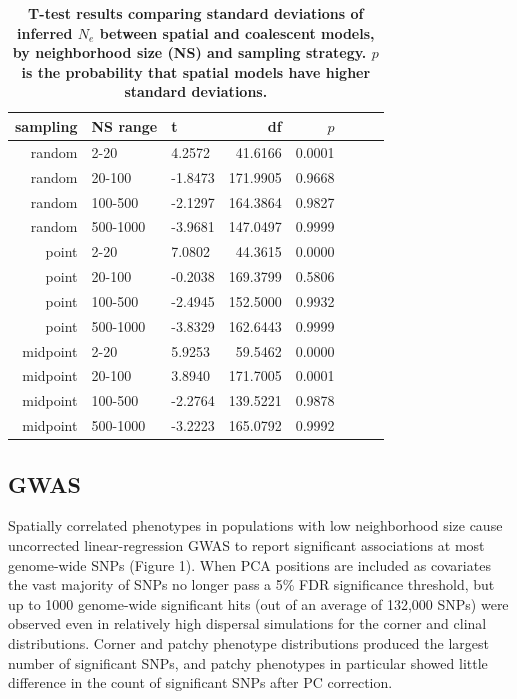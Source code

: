 \documentclass[9pt,twocolumn,twoside,lineno]{gsajnl}
\begin{document}
\begin{table}[ht]
\centering
\caption{\bf T-test results comparing standard deviations of inferred $N_{e}$ between spatial and coalescent models, by neighborhood size (NS) and sampling strategy. $p$ is the probability that spatial models have higher standard deviations.}
\begin{tabular}{rllrrrrr}
  \hline
sampling & NS range & t & df & $p$ \\ 
  \hline
random & 2-20 & 4.2572 & 41.6166 & 0.0001 \\ 
random & 20-100 & -1.8473 & 171.9905 & 0.9668 \\ 
random & 100-500 & -2.1297 & 164.3864  & 0.9827 \\ 
random & 500-1000 & -3.9681 & 147.0497 & 0.9999 \\ 
point & 2-20 & 7.0802 & 44.3615  & 0.0000 \\ 
point & 20-100 & -0.2038 & 169.3799 & 0.5806 \\ 
point & 100-500 & -2.4945 & 152.5000 & 0.9932 \\ 
point & 500-1000 & -3.8329 & 162.6443& 0.9999 \\ 
midpoint & 2-20 & 5.9253 & 59.5462 & 0.0000 \\ 
midpoint & 20-100 & 3.8940 & 171.7005  & 0.0001 \\ 
midpoint & 100-500 & -2.2764 & 139.5221 & 0.9878 \\ 
midpoint & 500-1000 & -3.2223 & 165.0792 & 0.9992 \\ 
   \hline
\end{tabular}
\end{table}

\subsection{GWAS}
Spatially correlated phenotypes in populations with low neighborhood size cause uncorrected linear-regression GWAS to report significant associations at most genome-wide SNPs (Figure 1). When PCA positions are included as covariates the vast majority of SNPs no longer pass a 5\% FDR significance threshold, but up to 1000 genome-wide significant hits (out of an average of 132,000 SNPs) were observed even in relatively high dispersal simulations for the corner and clinal distributions. Corner and patchy phenotype distributions produced the largest number of significant SNPs, and patchy phenotypes in particular showed little difference in the count of significant SNPs after PC correction.
\end{document}
